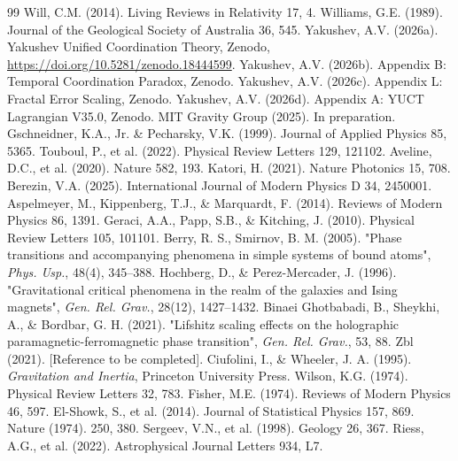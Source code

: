 \documentclass[12pt]{article}
\theoremstyle{remark}
\begin{document}
\begin{thebibliography}{99}
		 Will, C.M. (2014). Living Reviews in Relativity 17, 4.
		 Williams, G.E. (1989). Journal of the Geological Society of Australia 36, 545.
		 Yakushev, A.V. (2026a). Yakushev Unified Coordination Theory, Zenodo, \url{https://doi.org/10.5281/zenodo.18444599}.
		 Yakushev, A.V. (2026b). Appendix B: Temporal Coordination Paradox, Zenodo.
		 Yakushev, A.V. (2026c). Appendix L: Fractal Error Scaling, Zenodo.
		 Yakushev, A.V. (2026d). Appendix A: YUCT Lagrangian V35.0, Zenodo.
		 MIT Gravity Group (2025). In preparation.
		 Gschneidner, K.A., Jr. \& Pecharsky, V.K. (1999). Journal of Applied Physics 85, 5365.
		 Touboul, P., et al. (2022). Physical Review Letters 129, 121102.
		 Aveline, D.C., et al. (2020). Nature 582, 193.
		 Katori, H. (2021). Nature Photonics 15, 708.
		 Berezin, V.A. (2025). International Journal of Modern Physics D 34, 2450001.
		 Aspelmeyer, M., Kippenberg, T.J., \& Marquardt, F. (2014). Reviews of Modern Physics 86, 1391.
		 Geraci, A.A., Papp, S.B., \& Kitching, J. (2010). Physical Review Letters 105, 101101.
		 Berry, R. S., Smirnov, B. M. (2005). "Phase transitions and accompanying phenomena in simple systems of bound atoms", \textit{Phys. Usp.}, 48(4), 345–388.
		 Hochberg, D., \& Perez-Mercader, J. (1996). "Gravitational critical phenomena in the realm of the galaxies and Ising magnets", \textit{Gen. Rel. Grav.}, 28(12), 1427–1432.
		 Binaei Ghotbabadi, B., Sheykhi, A., \& Bordbar, G. H. (2021). "Lifshitz scaling effects on the holographic paramagnetic-ferromagnetic phase transition", \textit{Gen. Rel. Grav.}, 53, 88.
		 Zbl (2021). [Reference to be completed].
		 Ciufolini, I., \& Wheeler, J. A. (1995). \textit{Gravitation and Inertia}, Princeton University Press.
		 Wilson, K.G. (1974). Physical Review Letters 32, 783.
		 Fisher, M.E. (1974). Reviews of Modern Physics 46, 597.
		 El-Showk, S., et al. (2014). Journal of Statistical Physics 157, 869.
		 Nature (1974). 250, 380.
		 Sergeev, V.N., et al. (1998). Geology 26, 367.
		 Riess, A.G., et al. (2022). Astrophysical Journal Letters 934, L7.
	\end{thebibliography}
	
\end{document}
